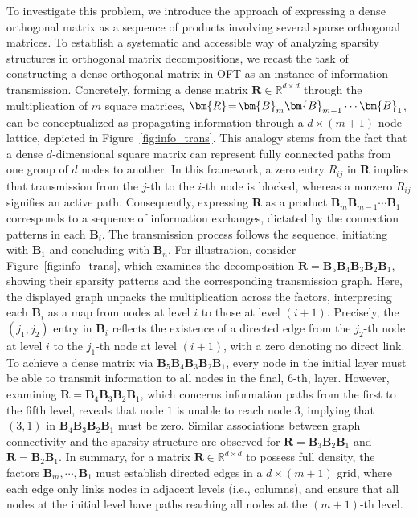 To investigate this problem, we introduce the approach of expressing a dense orthogonal matrix as a sequence of products involving several sparse orthogonal matrices. To establish a systematic and accessible way of analyzing sparsity structures in orthogonal matrix decompositions, we recast the task of constructing a dense orthogonal matrix in OFT as an instance of information transmission. Concretely, forming a dense matrix $\bm{R}\in\mathbb{R}^{d\times d}$ through the multiplication of $m$ square matrices, $\thickmuskip=2mu \medmuskip=2mu \bm{R}=\bm{B}_m\bm{B}_{m-1}\cdots\bm{B}_1$, can be conceptualized as propagating information through a $d\times (m+1)$ node lattice, depicted in Figure~\ref{fig:info_trans}. This analogy stems from the fact that a dense $d$-dimensional square matrix can represent fully connected paths from one group of $d$ nodes to another. In this framework, a zero entry $R_{ij}$ in $\bm{R}$ implies that transmission from the $j$-th to the $i$-th node is blocked, whereas a nonzero $R_{ij}$ signifies an active path. Consequently, expressing $\bm{R}$ as a product $\bm{B}_m\bm{B}_{m-1}\cdots\bm{B}_1$ corresponds to a sequence of information exchanges, dictated by the connection patterns in each $\bm{B}_i$. The transmission process follows the sequence, initiating with $\bm{B}_1$ and concluding with $\bm{B}_n$. For illustration, consider Figure~\ref{fig:info_trans}, which examines the decomposition $\bm{R}=\bm{B}_5\bm{B}_4\bm{B}_3\bm{B}_2\bm{B}_1$, showing their sparsity patterns and the corresponding transmission graph. Here, the displayed graph unpacks the multiplication across the factors, interpreting each $\bm{B}_i$ as a map from nodes at level $i$ to those at level $(i+1)$. Precisely, the $(j_1,j_2)$ entry in $\bm{B}_i$ reflects the existence of a directed edge from the $j_2$-th node at level $i$ to the $j_1$-th node at level $(i+1)$, with a zero denoting no direct link. To achieve a dense matrix via $\bm{B}_5\bm{B}_4\bm{B}_3\bm{B}_2\bm{B}_1$, every node in the initial layer must be able to transmit information to all nodes in the final, $6$-th, layer. However, examining $\bm{R}=\bm{B}_4\bm{B}_3\bm{B}_2\bm{B}_1$, which concerns information paths from the first to the fifth level, reveals that node $1$ is unable to reach node $3$, implying that $(3,1)$ in $\bm{B}_4\bm{B}_3\bm{B}_2\bm{B}_1$ must be zero. Similar associations between graph connectivity and the sparsity structure are observed for $\bm{R}=\bm{B}_3\bm{B}_2\bm{B}_1$ and $\bm{R}=\bm{B}_2\bm{B}_1$. In summary, for a matrix $\bm{R}\in\mathbb{R}^{d\times d}$ to possess full density, the factors $\bm{B}_m,\cdots,\bm{B}_1$ must establish directed edges in a $d\times (m+1)$ grid, where each edge only links nodes in adjacent levels (i.e., columns), and ensure that all nodes at the initial level have paths reaching all nodes at the $(m+1)$-th level.

